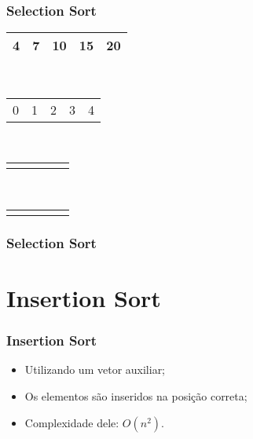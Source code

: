 \documentclass{beamer}
\begin{document}
\begin{frame}
    \frametitle{Selection Sort}
    \begin{center}
        \begin{table}
            \begin{tabular}{| p{0.25cm} | p{0.25cm} | p{0.25cm} | p{0.25cm} | p{0.25cm} |}
                \hline
                4 & 7 & 10 & 15 & 20 \\ \hline
            \end{tabular} \\
            \begin{tabular}{p{0.25cm} p{0.25cm} p{0.25cm} p{0.25cm} p{0.25cm}}
                0 & 1 & 2 & 3 & 4
            \end{tabular} \\
            \begin{tabular}{p{0.25cm} p{0.25cm} p{0.25cm} p{0.25cm} p{0.25cm}}
                 & & & &
            \end{tabular} \\
            \begin{tabular}{p{0.25cm} p{0.25cm} p{0.25cm} p{0.25cm} p{0.25cm}}
                 & & & &
            \end{tabular}
        \end{table}
	\end{center}
    \color{green}{Vetor Ordenado}
\end{frame}

\begin{frame}
	\frametitle{Selection Sort}
    \centering
    
\end{frame}

\section{Insertion Sort}

\begin{frame}
	\frametitle{Insertion Sort}
    \begin{itemize}[<+->]
        \item Utilizando um vetor auxiliar;
        \item Os elementos são inseridos na posição correta;
        \item Complexidade dele: $O(n^2)$.
    \end{itemize}
\end{frame}
\end{document}
